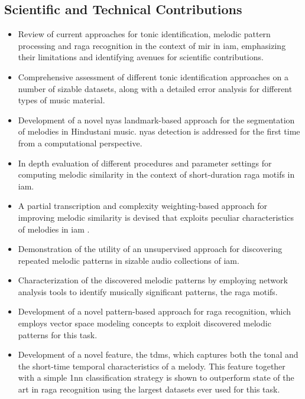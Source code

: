 \subsection*{Scientific and Technical Contributions}

\begin{itemize}
	\item Review of current approaches for tonic identification, melodic pattern processing and \gls{raga} recognition in the context of \gls{mir} in \gls{iam}, emphasizing their limitations and identifying avenues for scientific contributions.
	\item Comprehensive assessment of different tonic identification approaches on a number of sizable datasets,  along with a detailed error analysis for different types of music material.
	\item Development of a novel \gls{nyas} landmark-based approach for the segmentation of melodies in Hindustani music. \Gls{nyas} detection is addressed for the first time from a computational perspective.
	\item In depth evaluation of different procedures and parameter settings for computing melodic similarity in the context of short-duration \gls{raga} motifs in \gls{iam}. 
	\item A partial transcription and complexity weighting-based approach for improving melodic similarity is devised that exploits peculiar characteristics of melodies in \gls{iam} .
	\item Demonstration of the utility of an unsupervised approach for discovering repeated melodic patterns in sizable audio collections of \gls{iam}.
	\item Characterization of the discovered melodic patterns by employing network analysis tools to identify musically significant patterns, the \gls{raga} motifs. 
	\item Development of a novel pattern-based approach for \gls{raga} recognition, which employs vector space modeling concepts to exploit discovered melodic patterns for this task. 
	\item Development of  a novel feature, the \acrfull{tdms}, which captures both the tonal and the short-time temporal characteristics of a melody. This feature together with a simple \gls{1nn} classification strategy is shown to outperform state of the art in \gls{raga} recognition using the largest datasets ever used for this task. 
\end{itemize}

